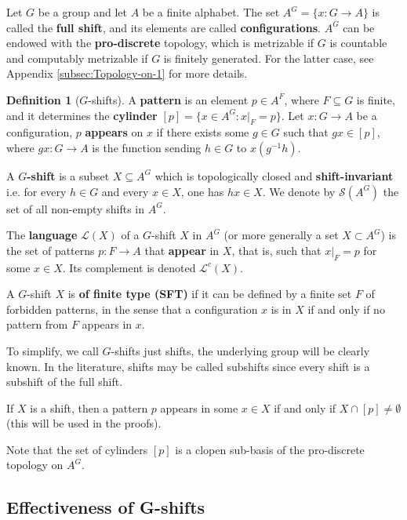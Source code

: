 \documentclass[french,american]{article}
\theoremstyle{plain}
\theoremstyle{definition}
\newtheorem{definition}[theorem]{Definition}
\theoremstyle{remark}
\theoremstyle{plain}
\begin{document}
Let $G$ be a group and let $A$ be a finite alphabet. The set $A^{G}=\{x:G\rightarrow A\}$ is called the \textbf{full shift},
and its elements are called \textbf{configurations}. $A^{G}$ can be endowed with the \textbf{pro-discrete} topology, which is
metrizable if $G$ is countable and computably metrizable if $G$
is finitely generated. For the latter case, see Appendix \ref{subsec:Topology-on-1} for more details.

\begin{definition}[$G$-shifts]

A \textbf{pattern} is an element $p\in A^{F}$, where $F\subseteq G$
is finite, and it determines the \textbf{cylinder} $[p]=\{x\in A^{G}:x|_{F}=p\}$.
Let $x:G\rightarrow A$ be a configuration, $p$ \textbf{appears}
on $x$ if there exists some $g\in G$ such that $gx\in[p]$, where
$gx:G\rightarrow A$ is the function sending $h\in G$ to $x(g^{-1}h)$.

A \textbf{$G$-shift} is a subset $X\subseteq A^{G}$ which is topologically
closed and \textbf{shift-invariant} i.e. for every $h\in G$ and every
$x\in X$, one has $hx\in X$. 
We denote by $\mathcal{S}(A^{G})$ the set of all non-empty shifts in $A^{G}$.

The \textbf{language} $\mathcal{L}(X)$ of a $G$-shift $X$ in $A^{G}$
(or more generally a set $X\subset A^G$) is the set of patterns $p: F\to A$ that \textbf{appear} in $X$, that is, such that $x|_F=p$ for some $x\in X$.
Its complement is denoted $\mathcal{L}^{c}(X)$. 

A $G$-shift $X$ is \textbf{of finite type (SFT)} if it can be defined
by a finite set $F$ of forbidden patterns, in the sense that a configuration
$x$ is in $X$ if and only if no pattern from $F$ appears in $x$.
\end{definition}

To simplify, we call $G$-shifts just shifts, the underlying group
will be clearly known. In the literature, shifts may be called subshifts
since every shift is a subshift of the full shift.

If $X$ is a shift, then a pattern $p$ appears in some $x\in X$
if and only if $X\cap[p]\neq\emptyset$ (this will be used in the
proofs).

Note that the set of cylinders $[p]$ is a clopen sub-basis of the pro-discrete
topology on $A^{G}$. 

\subsection{Effectiveness of G-shifts}
\end{document}
